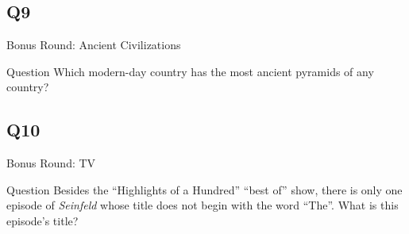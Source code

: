 \documentclass[11pt]{beamer}
\begin{document}
\subsection*{Q9}
\begin{frame}[t]{Bonus Round: Ancient Civilizations}
\begin{block}{Question}
Which modern-day country has the most ancient pyramids of any country?
\end{block}
\end{frame}
\subsection*{Q10}
\begin{frame}[t]{Bonus Round: TV}
\begin{block}{Question}
Besides the ``Highlights of a Hundred'' ``best of'' show, there is only one episode of \emph{Seinfeld} whose title does not begin with the word ``The''. What is this episode's title?
\end{block}
\end{frame}
\end{document}

